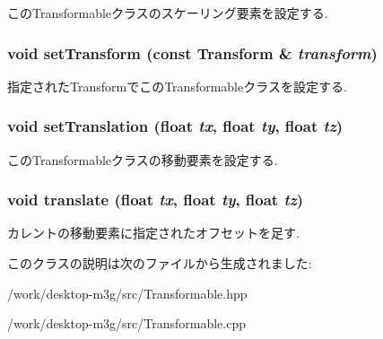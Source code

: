 このTransformableクラスのスケーリング要素を設定する. \hypertarget{classm3g_1_1Transformable_05052269aaf19775f3ff1a10d042777e}{
\subsubsection[{setTransform}]{\setlength{\rightskip}{0pt plus 5cm}void setTransform (const {\bf Transform} \& {\em transform})}}
\label{classm3g_1_1Transformable_05052269aaf19775f3ff1a10d042777e}


指定されたTransformでこのTransformableクラスを設定する. \hypertarget{classm3g_1_1Transformable_afd728a7db85b8e12bdafc2b3c08a515}{
\subsubsection[{setTranslation}]{\setlength{\rightskip}{0pt plus 5cm}void setTranslation (float {\em tx}, \/  float {\em ty}, \/  float {\em tz})}}
\label{classm3g_1_1Transformable_afd728a7db85b8e12bdafc2b3c08a515}


このTransformableクラスの移動要素を設定する. \hypertarget{classm3g_1_1Transformable_66d493b8307a85e615c4eb89116f2e09}{
\subsubsection[{translate}]{\setlength{\rightskip}{0pt plus 5cm}void translate (float {\em tx}, \/  float {\em ty}, \/  float {\em tz})}}
\label{classm3g_1_1Transformable_66d493b8307a85e615c4eb89116f2e09}


カレントの移動要素に指定されたオフセットを足す. 

このクラスの説明は次のファイルから生成されました:\begin{CompactItemize}
\item 
/work/desktop-m3g/src/Transformable.hpp\item 
/work/desktop-m3g/src/Transformable.cpp\end{CompactItemize}
